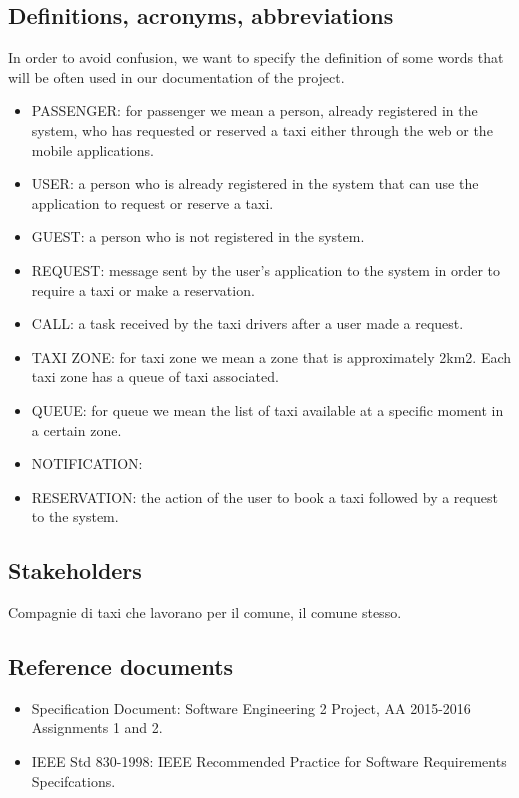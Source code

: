 \documentclass{article}
\begin{document}
	\subsection{Definitions, acronyms, abbreviations}
    	In order to avoid confusion, we want to specify the definition of some words that will be often used in our documentation of the project. 
    	\begin{itemize}
    		\item PASSENGER: for passenger we mean a person, already registered in the system, who has requested or reserved a taxi either through the web or the mobile applications.
    		\item USER: a person who is already registered in the system that can use the application to request or reserve a taxi.
    		\item GUEST:  a person who is not registered in the system.
    		\item REQUEST: message sent by the user's application to the system in order to require a taxi or make a reservation.
    		\item CALL: a task received by the taxi drivers after a user made a request.
    		\item TAXI ZONE: for taxi zone we mean a zone that is approximately 2km2. Each taxi zone has a queue of taxi associated. 
    	    \item QUEUE: for queue we mean the list of taxi available at a specific moment in a certain zone.
    		\item NOTIFICATION: 
    		\item RESERVATION: the action of the user to book a taxi followed by a request to the system.
    	\end{itemize}
    
    \subsection{Stakeholders}
        Compagnie di taxi che lavorano per il comune, il comune stesso.
    
	\subsection{Reference documents}
	    \begin{itemize}
	        \item Specification Document: Software Engineering 2 Project, AA 2015-2016 Assignments 1 and 2.
	        \item IEEE Std 830-1998: IEEE Recommended Practice for Software Requirements Specifcations.
	    \end{itemize}
\end{document}
